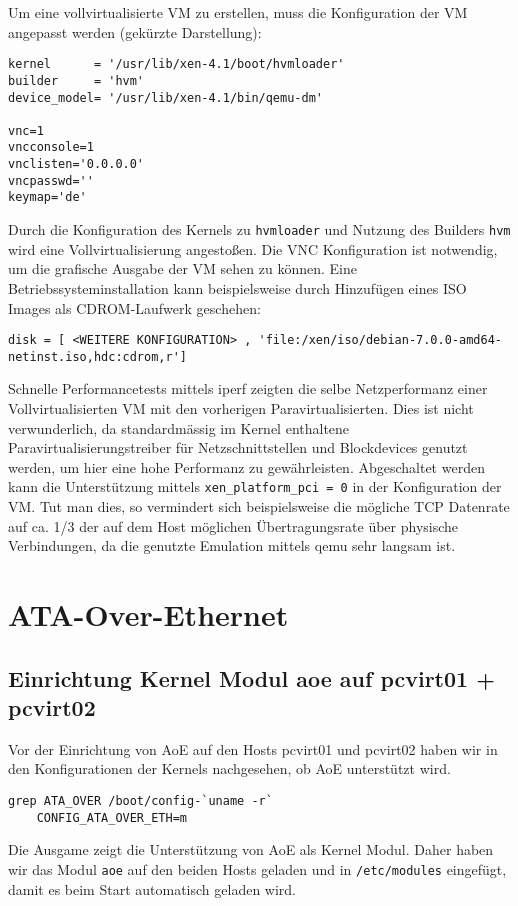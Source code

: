 Um eine vollvirtualisierte VM zu erstellen, muss die Konfiguration der VM angepasst werden (gekürzte Darstellung):
\setupVerbatimOut
\begin{verbatim}
kernel      = '/usr/lib/xen-4.1/boot/hvmloader'
builder     = 'hvm'
device_model= '/usr/lib/xen-4.1/bin/qemu-dm'

vnc=1
vncconsole=1
vnclisten='0.0.0.0'
vncpasswd=''
keymap='de'
\end{verbatim}

Durch die Konfiguration des Kernels zu \verb#hvmloader# und Nutzung des Builders \verb#hvm# wird eine Vollvirtualisierung angestoßen. Die VNC Konfiguration ist notwendig, um die grafische Ausgabe der VM sehen zu können. Eine Betriebssysteminstallation kann beispielsweise durch Hinzufügen eines ISO Images als CDROM-Laufwerk geschehen: 
\setupVerbatimOut
\begin{verbatim}
disk = [ <WEITERE KONFIGURATION> , 'file:/xen/iso/debian-7.0.0-amd64-netinst.iso,hdc:cdrom,r']
\end{verbatim}

Schnelle Performancetests mittels iperf zeigten die selbe Netzperformanz einer Vollvirtualisierten VM mit den vorherigen Paravirtualisierten. Dies ist nicht verwunderlich, da standardmässig im Kernel enthaltene Paravirtualisierungstreiber für Netzschnittstellen und Blockdevices genutzt werden, um hier eine hohe Performanz zu gewährleisten. 
Abgeschaltet werden kann die Unterstützung mittels \verb#xen_platform_pci = 0# in der Konfiguration der VM. Tut man dies, so vermindert sich beispielsweise die mögliche TCP Datenrate auf ca. 1/3 der auf dem Host möglichen Übertragungsrate über physische Verbindungen, da die genutzte Emulation mittels qemu sehr langsam ist.

\chapter{ATA-Over-Ethernet}
\label{chap:aoe}
\section{Einrichtung Kernel Modul aoe auf pcvirt01 + pcvirt02}
Vor der Einrichtung von AoE auf den Hosts pcvirt01 und pcvirt02 haben wir in den Konfigurationen der Kernels nachgesehen, ob AoE unterstützt wird. 
\setupVerbatimOut
\begin{verbatim}
grep ATA_OVER /boot/config-`uname -r`
    CONFIG_ATA_OVER_ETH=m
\end{verbatim} 
Die Ausgame zeigt die Unterstützung von AoE als Kernel Modul. Daher haben wir das Modul \verb#aoe# auf den beiden Hosts geladen und  in \verb#/etc/modules# eingefügt, damit es beim Start automatisch geladen wird. 

